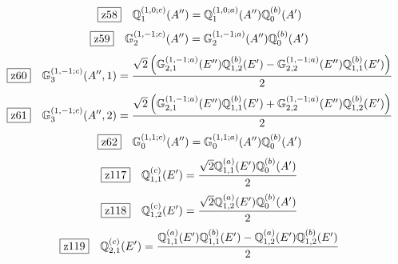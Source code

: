 \documentclass[fleqn,10pt,landscape]{jsarticle}
\begin{document}
\begin{dmath*}
\hspace*{3mm}\fbox{z58}\quad \mathbb{Q}_{1}^{(1,0;c)}(A^{\prime\prime})=\mathbb{Q}_{1}^{(1,0;a)}(A^{\prime\prime}) \mathbb{Q}_{0}^{(b)}(A^{\prime})
\end{dmath*}
\begin{dmath*}
\hspace*{3mm}\fbox{z59}\quad \mathbb{G}_{2}^{(1,-1;c)}(A^{\prime\prime})=\mathbb{G}_{2}^{(1,-1;a)}(A^{\prime\prime}) \mathbb{Q}_{0}^{(b)}(A^{\prime})
\end{dmath*}
\begin{dmath*}
\hspace*{3mm}\fbox{z60}\quad \mathbb{G}_{3}^{(1,-1;c)}(A^{\prime\prime},1)=\frac{\sqrt{2} \left(\mathbb{G}_{2,1}^{(1,-1;a)}(E^{\prime\prime}) \mathbb{Q}_{1,2}^{(b)}(E^{\prime}) - \mathbb{G}_{2,2}^{(1,-1;a)}(E^{\prime\prime}) \mathbb{Q}_{1,1}^{(b)}(E^{\prime})\right)}{2}
\end{dmath*}
\begin{dmath*}
\hspace*{3mm}\fbox{z61}\quad \mathbb{G}_{3}^{(1,-1;c)}(A^{\prime\prime},2)=\frac{\sqrt{2} \left(\mathbb{G}_{2,1}^{(1,-1;a)}(E^{\prime\prime}) \mathbb{Q}_{1,1}^{(b)}(E^{\prime}) + \mathbb{G}_{2,2}^{(1,-1;a)}(E^{\prime\prime}) \mathbb{Q}_{1,2}^{(b)}(E^{\prime})\right)}{2}
\end{dmath*}
\begin{dmath*}
\hspace*{3mm}\fbox{z62}\quad \mathbb{G}_{0}^{(1,1;c)}(A^{\prime\prime})=\mathbb{G}_{0}^{(1,1;a)}(A^{\prime\prime}) \mathbb{Q}_{0}^{(b)}(A^{\prime})
\end{dmath*}
\begin{dmath*}
\hspace*{3mm}\fbox{z117}\quad \mathbb{Q}_{1,1}^{(c)}(E^{\prime})=\frac{\sqrt{2} \mathbb{Q}_{1,1}^{(a)}(E^{\prime}) \mathbb{Q}_{0}^{(b)}(A^{\prime})}{2}
\end{dmath*}
\begin{dmath*}
\hspace*{3mm}\fbox{z118}\quad \mathbb{Q}_{1,2}^{(c)}(E^{\prime})=\frac{\sqrt{2} \mathbb{Q}_{1,2}^{(a)}(E^{\prime}) \mathbb{Q}_{0}^{(b)}(A^{\prime})}{2}
\end{dmath*}
\begin{dmath*}
\hspace*{3mm}\fbox{z119}\quad \mathbb{Q}_{2,1}^{(c)}(E^{\prime})=\frac{\mathbb{Q}_{1,1}^{(a)}(E^{\prime}) \mathbb{Q}_{1,1}^{(b)}(E^{\prime}) - \mathbb{Q}_{1,2}^{(a)}(E^{\prime}) \mathbb{Q}_{1,2}^{(b)}(E^{\prime})}{2}
\end{dmath*}
\end{document}
